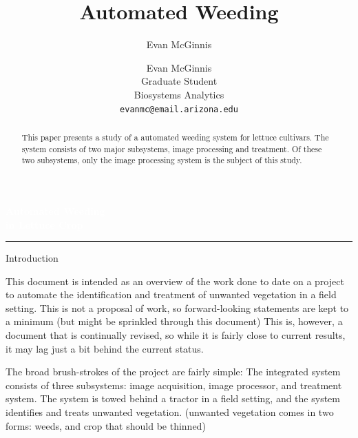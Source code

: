 \documentclass[letterpaper]{article}
\author{Evan McGinnis}
\title{Automated Weeding}
\author{%
    Evan McGinnis \\
    Graduate Student \\
    Biosystems Analytics \\
    \texttt{evanmc@email.arizona.edu}\vspace{40pt} \\
    }
\makeatletter
\def\printauthor{%
    {\large \@author}}
\makeatother
\begin{document}
\begin{titlepage}
\BgThispage
{}
\vspace*{1cm}
\noindent
\textcolor{white}{\Huge\textbf{\textsf{Automated Weeding\\ in Lettuce Crop}}}
\vspace*{2.5cm}\par
\noindent
\begin{minipage}{0.35\linewidth}
    \begin{flushright}
        \printauthor
    \end{flushright}
\end{minipage} \hspace{15pt}
%
\begin{minipage}{0.02\linewidth}
    \rule{1pt}{175pt}
\end{minipage} \hspace{-10pt}
%
\begin{minipage}{0.6\linewidth}
\vspace{5pt}
    \begin{abstract} 
This paper presents a study of a automated weeding system for lettuce cultivars.  The system consists of two major subsystems, image processing and treatment. Of these two subsystems, only the image processing system is the subject of this study.
    \end{abstract}
\end{minipage}
\end{titlepage}
\restoregeometry
%
%
\tableofcontents
\listoffigures
\newpage

%
%



Introduction

This document is intended as an overview of the work done to date on a project to automate the identification and treatment of unwanted vegetation in a field setting. This is not a proposal of work, so forward-looking statements are kept to a minimum (but might be sprinkled through this document) This is, however, a document that is continually revised, so while it is fairly close to current results, it may lag just a bit behind the current status.

The broad brush-strokes of the project are fairly simple:
The integrated system consists of three subsystems: image acquisition, image processor, and treatment system.
The system is towed behind a tractor in a field setting, and the system identifies and treats unwanted vegetation. (unwanted vegetation comes in two forms: weeds, and crop that should be thinned)
\end{document}
